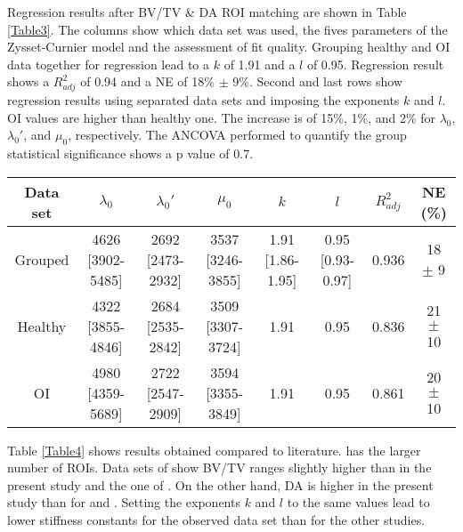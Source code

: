 \documentclass[a4paper,fleqn]{DC_ArtStyle}
\begin{document}
Regression results after BV/TV \& DA ROI matching are shown in Table \ref{Table3}. The columns show which data set was used, the fives parameters of the Zysset-Curnier model and the assessment of fit quality. Grouping healthy and OI data together for regression lead to a $k$ of 1.91 and a $l$ of 0.95. Regression result shows a $R^2_{adj}$ of 0.94 and a NE of 18\% $\pm$ 9\%. Second and last rows show regression results using separated data sets and imposing the exponents $k$ and $l$. OI values are higher than healthy one. The increase is of 15\%, 1\%, and 2\% for $\lambda_0$, $\lambda_0'$, and $\mu_0$, respectively. The ANCOVA performed to quantify the group statistical significance shows a p value of 0.7.\\

\begin{table*}[b]
	\caption{Constants comparison between grouped and separated data sets. Values are presented as value [95\% CI] or mean $\pm$ standard deviation.}
	\label{Table3}
	\begin{tabular}{cccccccc}
		\toprule
		Data set & $\lambda_0$ & $\lambda_0'$ & $\mu_0$ & $k$ & $l$ & $R^2_{adj}$ & NE (\%) \\
		\midrule
		Grouped & 4626 [3902-5485] & 2692 [2473-2932] & 3537 [3246-3855] & 1.91 [1.86-1.95] & 0.95 [0.93-0.97] & 0.936 & 18 $\pm$ 9\\
		
		Healthy & 4322 [3855-4846] & 2684 [2535-2842] & 3509 [3307-3724] & 1.91 & 0.95 & 0.836 & 21 $\pm$ 10\\
		
		OI & 4980 [4359-5689] & 2722 [2547-2909] & 3594 [3355-3849] & 1.91 & 0.95 & 0.861 & 20 $\pm$ 10\\
		\bottomrule
	\end{tabular}
\end{table*}

Table \ref{Table4} shows results obtained compared to literature. \citeauthor{Gross2013} \cite{Gross2013} has the larger number of ROIs. Data sets of \citeauthor{Panyasantisuk2015} \cite{Panyasantisuk2015} show BV/TV ranges slightly higher than in the present study and the one of \citeauthor{Gross2013} \cite{Gross2013}. On the other hand, DA is higher in the present study than for \citeauthor{Panyasantisuk2015} \cite{Panyasantisuk2015} and \citeauthor{Gross2013} \cite{Gross2013}. Setting the exponents $k$ and $l$ to the same values lead to lower stiffness constants for the observed data set than for the other studies.\\
\end{document}
